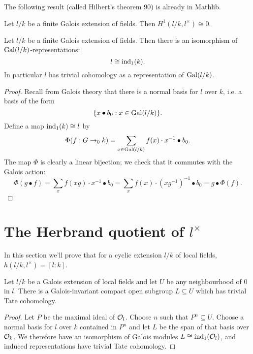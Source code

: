 The following result (called Hilbert's theorem 90) is already in Mathlib.

\begin{theorem}\label{thm:hilbert 90}
	\mathlibok
	Let $l/k$ be a finite Galois extension of fields.
	Then $H^1(l/k, l^\times) \cong 0$.
\end{theorem}

\begin{theorem}\label{thm:additive field trivial}
	Let $l/k$ be a finite Galois extension of fields.
	Then there is an isomorphism of $\mathrm{Gal}(l/k)$-representations:
	\[
		l \cong \mathrm{ind}_1(k).
	\]
	In particular $l$ has trivial cohomology as a representation of $\mathrm{Gal}(l/k)$.
\end{theorem}

\begin{proof}
	Recall from Galois theory that there is a normal basis for $l$ over $k$, i.e. a basis of the
	form
	\[
		\{x \bullet b_0 : x \in \mathrm{Gal}(l/k)\}.
	\]
	Define a map $\mathrm{ind}_1(k) \cong l$ by
	\[
		\Phi (f : G \to_0 k) = \sum_{x \in \mathrm{Gal}(l/k)} f(x) \cdot x^{-1} \bullet b_0.
	\]
	The map $\Phi$ is clearly a linear bijection;
	we check that it commutes with the Galois action:
	\[
		\Phi(g\bullet f)
		= \sum_x f(xg) \cdot x^{-1} \bullet b_0
		= \sum_x f(x) \cdot (xg^{-1})^{-1} \bullet b_0
		= g \bullet \Phi(f).
	\]
\end{proof}






\section{The Herbrand quotient of \texorpdfstring{$l^{\times}$}{l*}}

In this section we'll prove that for a cyclic extension $l/k$ of local fields,
$h(l/k,l^\times) = [l:k]$.

\begin{lemma}
	\label{lem:exists additive trivial}
	Let $l/k$ be a Galois extension of local fields and
	let $U$ be any neighbourhood of $0$ in $l$.
	There is a Galois-invariant compact open subgroup $L \subseteq U$
	which has trivial Tate cohomology.
\end{lemma}

\begin{proof}
	Let $P$ be the maximal ideal of ${\mathcal O}_l$.
	Choose $n$ such that $P^n \subseteq U$.
	Choose a normal basis for $l$ over $k$ contained in $P^n$
	and let $L$ be the span of that basis over ${\mathcal O}_k$.
	We therefore have an isomorphism of Galois modules $L \cong \mathrm{ind}_1({\mathcal O}_l)$,
	and induced representations have trivial Tate cohomology.
\end{proof}

